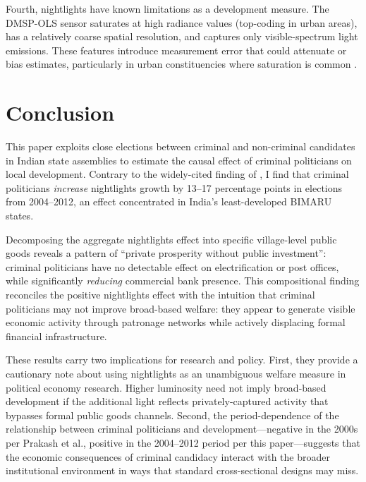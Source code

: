 \documentclass[12pt]{article}
\begin{document}
Fourth, nightlights have known limitations as a development measure. The DMSP-OLS sensor saturates at high radiance values (top-coding in urban areas), has a relatively coarse spatial resolution, and captures only visible-spectrum light emissions. These features introduce measurement error that could attenuate or bias estimates, particularly in urban constituencies where saturation is common \citep{henderson2012}.


\section{Conclusion}

This paper exploits close elections between criminal and non-criminal candidates in Indian state assemblies to estimate the causal effect of criminal politicians on local development. Contrary to the widely-cited finding of \citet{prakash2019}, I find that criminal politicians \textit{increase} nightlights growth by 13--17 percentage points in elections from 2004--2012, an effect concentrated in India's least-developed BIMARU states.

Decomposing the aggregate nightlights effect into specific village-level public goods reveals a pattern of ``private prosperity without public investment'': criminal politicians have no detectable effect on electrification or post offices, while significantly \textit{reducing} commercial bank presence. This compositional finding reconciles the positive nightlights effect with the intuition that criminal politicians may not improve broad-based welfare: they appear to generate visible economic activity through patronage networks while actively displacing formal financial infrastructure.

These results carry two implications for research and policy. First, they provide a cautionary note about using nightlights as an unambiguous welfare measure in political economy research. Higher luminosity need not imply broad-based development if the additional light reflects privately-captured activity that bypasses formal public goods channels. Second, the period-dependence of the relationship between criminal politicians and development---negative in the 2000s per Prakash et al., positive in the 2004--2012 period per this paper---suggests that the economic consequences of criminal candidacy interact with the broader institutional environment in ways that standard cross-sectional designs may miss.
\end{document}
